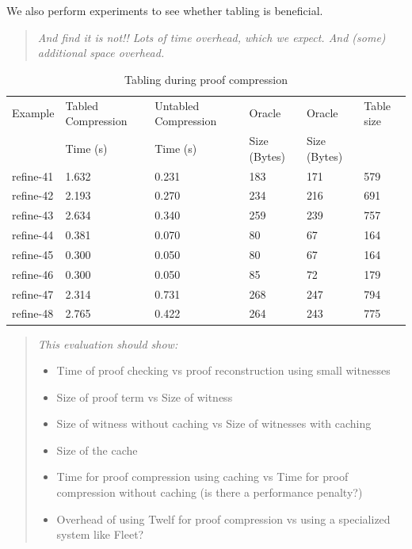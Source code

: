 \documentclass{acmconf}
\newenvironment{note}{\begin{quote}\message{note!}\it}{\end{quote}}
\begin{document}
We also perform experiments to see whether tabling is beneficial.
\begin{note}
And find it is not!! 
Lots of time overhead, which we expect.
And (some) additional space overhead.
\end{note}

\begin{table}[tbp]
\begin{center}
\begin{small}
\begin{tabular}{|l|l|l|l|l|l|}
\hline
Example & Tabled Compression 
& Untabled Compression & Oracle & Oracle & Table size\\
& Time (s) & Time (s) & Size (Bytes) & Size (Bytes) &\\
\hline
refine-41 & 1.632 & 0.231 & 183 & 171 & 579\\
refine-42 & 2.193 & 0.270 & 234 & 216 & 691\\
refine-43 & 2.634 & 0.340 & 259 & 239 & 757\\
refine-44 & 0.381 & 0.070 & 80 & 67 & 164\\
refine-45 & 0.300 & 0.050 & 80 & 67 & 164\\
refine-46 & 0.300 & 0.050 & 85 & 72 & 179\\
refine-47 & 2.314 & 0.731 & 268 & 247 & 794\\
refine-48 & 2.765 & 0.422 & 264 & 243 & 775\\
\hline
\end{tabular}
\end{small}
\end{center}
\caption{\label{tab:prooftable} Tabling during proof compression}
\end{table}

\begin{note}
This evaluation should show:
\begin{itemize}
\item Time of proof checking vs proof reconstruction using small
  witnesses
\item Size of proof term vs Size of witness 
\item Size of witness without caching vs Size of witnesses with
  caching
\item Size of the cache
\item Time for proof compression using caching vs Time for proof
  compression without caching (is there a performance penalty?)
\item Overhead of using Twelf for proof compression vs using a
  specialized system like Fleet?
\end{itemize}
\end{note}
\end{document}

